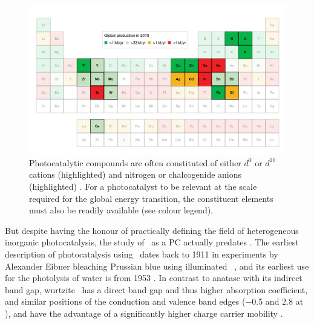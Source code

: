 \documentclass[draft,webedition,openright,titles,swedish,english]{LuaUUThesis}\usepackage[]{graphicx}\usepackage[]{xcolor}
\newenvironment{knitrout}{}{} %
\begin{document}
%

\begin{figure}[tbp]
\begin{knitrout}\scriptsize
{}\color{fgcolor}

{\centering \includegraphics[width=4.72in]{figure/0100-fig-elements-photocatalysis-1} 

}


\end{knitrout}
\caption[Chemical elements in photocatalytic compounds]{%
   Photocatalytic compounds are often constituted of either
   $d^0$ or $d^{10}$ cations (highlighted) and nitrogen or chalcogenide anions
   (highlighted) \cite{Zhu2011,Maeda2011}.
   For a photocatalyst to be relevant at the scale required for the global energy
   transition, the constituent elements must also be readily available \cite{Vesborg2012}
   (see colour legend).
}
\label{fig:0100-elements-of-photocatalysis}
\end{figure}

But despite  having the honour of practically defining the field of
heterogeneous inorganic photocatalysis, the study of \ZnO\ as a \gls{PC} actually
predates .
The earliest description of photocatalysis using \zincox\ dates back to 1911
in experiments by Alexander Eibner bleaching Prussian blue using
illuminated \ZnO\ \cite{vonEibner1911}, and its earliest use for
the photolysis of water is from 1953 \cite{Markham1953,Markham1955}.
In contrast to anatase  with its indirect band gap,
wurtzite \zincox\ has a direct band gap and thus higher absorption coefficient,
and similar positions of the conduction and valence band edges
(\qty{-0.5}{\voltNHE} and \qty{+2.8}{\voltNHE} at ),
and have the advantage of a significantly higher charge carrier mobility
\cite{Boschloo2006,Jacobsson2012a}.
\end{document}
